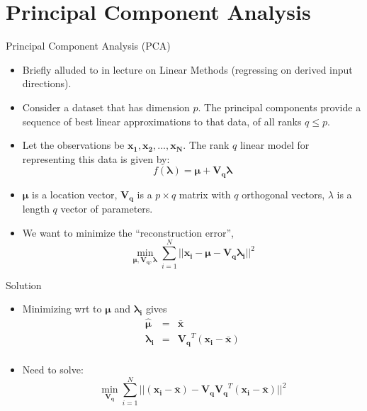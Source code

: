 \documentclass[aspectratio=169]{beamer}
\let \vec \mathbf
\begin{document}
\section{Principal Component Analysis}


\begin{frame}{Principal Component Analysis (PCA)}
    \begin{itemize}
        \item Briefly alluded to in lecture on Linear Methods (regressing on derived input directions).
        \item Consider a dataset that has dimension $p$. The principal components provide a sequence of best linear approximations to that data, of all ranks $q \leq p$.
        \item Let the observations be $\vec{x_1}, \vec{x_2}, ..., \vec{x_N}$. The rank $q$ linear model for representing this data is given by:
        \begin{equation*}
            f(\vec{\lambda}) = \vec{\mu} + \vec{V_q}\vec{\lambda}
        \end{equation*}
        \item $\vec{\mu}$ is a location vector, $\vec{V_q}$ is a $p \times q$ matrix with $q$ orthogonal vectors, $\lambda$ is a length $q$ vector of parameters.
        \item We want to minimize the ``reconstruction error'',
        \begin{equation*}
            \min_{\vec{\mu}, \vec{V_q}, \vec{\lambda}} \sum_{i=1}^N ||\vec{x_i} - \vec{\mu} - \vec{V_q}\vec{\lambda_i}||^2
        \end{equation*}
    \end{itemize}
\end{frame} 

\begin{frame}{Solution}
    \begin{itemize}
        \item Minimizing wrt to $\vec{\mu}$ and $\vec{\lambda_i}$ gives
        \begin{eqnarray*}
        \hat{\vec{\mu}} & = & \bar{\vec{x}}\\
        \vec{\lambda_i} & = & \vec{V_q}^T(\vec{x_i}-\bar{\vec{x}})\\
    \end{eqnarray*}
        \item Need to solve:
        \begin{equation*}
          \min_{\vec{V_q}} \sum_{i=1}^N ||(\vec{x_i}-\bar{\vec{x}}) - \vec{V_q}\vec{V_q}^T(\vec{x_i}-\bar{\vec{x}})||^2
        \end{equation*}
    \end{itemize}
\end{frame} 
\end{document}
